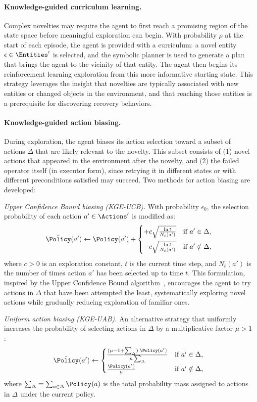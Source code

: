 \paragraph{Knowledge-guided curriculum learning.} Complex novelties may require the agent to first reach a promising region of the state space before meaningful exploration can begin. With probability $\rho$ at the start of each episode, the agent is provided with a curriculum: a novel entity $\epsilon \in \Entities'$ is selected, and the symbolic planner is used to generate a plan that brings the agent to the vicinity of that entity. The agent then begins its reinforcement learning exploration from this more informative starting state. This strategy leverages the insight that novelties are typically associated with new entities or changed objects in the environment, and that reaching those entities is a prerequisite for discovering recovery behaviors.

\paragraph{Knowledge-guided action biasing.} During exploration, the agent biases its action selection toward a subset of actions $\Delta$ that are likely relevant to the novelty. This subset consists of (1) novel actions that appeared in the environment after the novelty, and (2) the failed operator itself (in executor form), since retrying it in different states or with different preconditions satisfied may succeed. Two methods for action biasing are developed:

\emph{Upper Confidence Bound biasing (KGE-UCB).} With probability $\epsilon_0$, the selection probability of each action $a' \in \Actions'$ is modified as:
\[
\hat{\Policy}(a') \gets \Policy(a') + 
\begin{cases}
+c \sqrt{\frac{\ln t}{N_t(a')}} & \text{if } a' \in \Delta, \\[6pt]
-c \sqrt{\frac{\ln t}{N_t(a')}} & \text{if } a' \notin \Delta,
\end{cases}
\]
where $c > 0$ is an exploration constant, $t$ is the current time step, and $N_t(a')$ is the number of times action $a'$ has been selected up to time $t$. This formulation, inspired by the Upper Confidence Bound algorithm~\citep{auer2002ucb}, encourages the agent to try actions in $\Delta$ that have been attempted the least, systematically exploring novel actions while gradually reducing exploration of familiar ones.

\emph{Uniform action biasing (KGE-UAB).} An alternative strategy that uniformly increases the probability of selecting actions in $\Delta$ by a multiplicative factor $\mu > 1$:
\[
\hat{\Policy}(a') \gets 
\begin{cases}
\frac{(\mu - 1 + \sum_\Delta) \cdot \Policy(a')}{\mu \sum_\Delta} & \text{if } a' \in \Delta, \\[6pt]
\frac{\Policy(a')}{\mu} & \text{if } a' \notin \Delta,
\end{cases}
\]
where $\sum_\Delta = \sum_{a \in \Delta} \Policy(a)$ is the total probability mass assigned to actions in $\Delta$ under the current policy.

